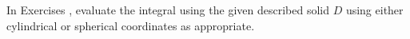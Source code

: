 {\noindent In Exercises} 
{,  evaluate the integral using the given described solid $D$ using either cylindrical or spherical coordinates as appropriate.
}

